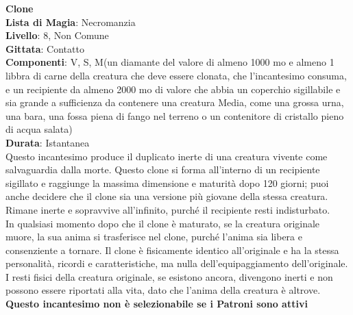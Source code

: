 \documentclass[a4paper,twoside,openany]{book}
\begin{document}
\begin{multicols}{2}
\medskip\textbf{Clone}\\
\textbf{Lista di Magia}: Necromanzia\\
\textbf{Livello}: 8, Non Comune\\
\textbf{Gittata}: Contatto\\
\textbf{Componenti}: V, S, M(un diamante del valore di almeno 1000 mo e almeno 1 libbra di carne della creatura che deve essere clonata, che l'incantesimo consuma, e un recipiente da almeno 2000 mo di valore che abbia un coperchio sigillabile e sia grande a sufficienza da contenere una creatura Media, come una grossa urna, una bara, una fossa piena di fango nel terreno o un contenitore di cristallo pieno di acqua salata)\\
\textbf{Durata}: Istantanea\\
Questo incantesimo produce il duplicato inerte di una creatura vivente come salvaguardia dalla morte. Questo clone si forma all'interno di un recipiente sigillato e raggiunge la massima dimensione e maturità dopo 120 giorni; puoi anche decidere che il clone sia una versione più giovane della stessa creatura. Rimane inerte e sopravvive all'infinito, purché il recipiente resti indisturbato.\\
In qualsiasi momento dopo che il clone è maturato, se la creatura originale muore, la sua anima si trasferisce nel clone, purché l'anima sia libera e consenziente a tornare. Il clone è fisicamente identico all'originale e ha la stessa personalità, ricordi e caratteristiche, ma nulla dell'equipaggiamento dell'originale. I resti fisici della creatura originale, se esistono ancora, divengono inerti e non possono essere riportati alla vita, dato che l'anima della creatura è altrove. \\
\textbf{Questo incantesimo non è selezionabile se i Patroni sono attivi}


\end{multicols}
\end{document}
